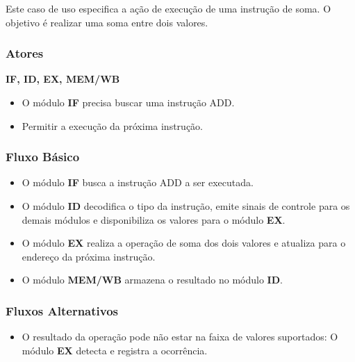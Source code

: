 
Este caso de uso especifica a ação de execução de uma instrução de soma. O objetivo é realizar uma soma entre dois valores.
 
\subsubsection*{Atores}
\textbf{IF, ID, EX, MEM/WB}

\preconditions 
\begin{itemize}
 \item O módulo \textbf{IF} precisa buscar uma instrução ADD.
\end{itemize}

\postconditions
\begin{itemize}
  \item Permitir a execução da próxima instrução.
\end{itemize}

\subsubsection*{Fluxo Básico}
\begin{itemize}
\item O módulo \textbf{IF} busca a instrução ADD a ser executada.
\item O módulo \textbf{ID} decodifica o tipo da instrução, emite sinais de controle para os demais módulos e disponibiliza os valores para o módulo \textbf{EX}.
\item O módulo \textbf{EX} realiza a operação de soma dos dois valores e atualiza para o endereço da próxima instrução.
\item O módulo \textbf{MEM/WB} armazena o resultado no módulo \textbf{ID}.
\end{itemize}

\subsubsection*{Fluxos Alternativos}
\begin{itemize}
\item O resultado da operação pode não estar na faixa de valores suportados:
\subitem O módulo \textbf{EX} detecta e registra a ocorrência.
\end{itemize}

%		

